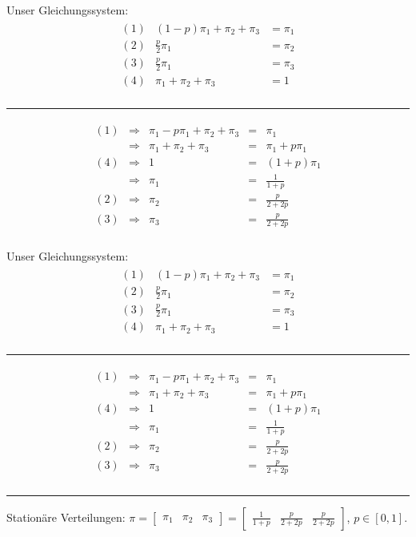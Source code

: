 \documentclass[t,11pt]{beamer}
\begin{document}
\begin{frame}
Unser Gleichungssystem:
\begin{align*}
\begin{matrix}
(1) & (1-p) \pi_1 + \pi_2 + \pi_3 &= \pi_1 \\
(2) & \frac{p}{2}\pi_1 &= \pi_2 \\
(3) & \frac{p}{2}\pi_1 &= \pi_3 \\
(4) & \pi_1+\pi_2+\pi_3 &= 1 \\
\end{matrix}
\end{align*}
\hrule
\begin{align*}
\begin{matrix}
(1) & \Longrightarrow & \pi_1-p\pi_1+\pi_2+\pi_3 &=& \pi_1 \\
& \Longrightarrow & \pi_1+\pi_2+\pi_3 &=& \pi_1 + p \pi_1 \\
(4) & \Longrightarrow & 1 &=& (1+p)\pi_1 \\
& \Longrightarrow & \pi_1 &=& \frac{1}{1+p} \\
(2) & \Longrightarrow & \pi_2 &=& \frac{p}{2+2p} \\
(3) & \Longrightarrow & \pi_3 &=& \frac{p}{2+2p} \\
\end{matrix}
\end{align*}
\end{frame}

\begin{frame}
Unser Gleichungssystem:
\begin{align*}
\begin{matrix}
(1) & (1-p) \pi_1 + \pi_2 + \pi_3 &= \pi_1 \\
(2) & \frac{p}{2}\pi_1 &= \pi_2 \\
(3) & \frac{p}{2}\pi_1 &= \pi_3 \\
(4) & \pi_1+\pi_2+\pi_3 &= 1 \\
\end{matrix}
\end{align*}
\hrule
\begin{align*}
\begin{matrix}
(1) & \Longrightarrow & \pi_1-p\pi_1+\pi_2+\pi_3 &=& \pi_1 \\
& \Longrightarrow & \pi_1+\pi_2+\pi_3 &=& \pi_1 + p \pi_1 \\
(4) & \Longrightarrow & 1 &=& (1+p)\pi_1 \\
& \Longrightarrow & \pi_1 &=& \frac{1}{1+p} \\
(2) & \Longrightarrow & \pi_2 &=& \frac{p}{2+2p} \\
(3) & \Longrightarrow & \pi_3 &=& \frac{p}{2+2p} \\
\end{matrix}
\end{align*}
\hrule
\vspace{0.2cm}

Stationäre Verteilungen: $\pi=\begin{bmatrix}
\pi_1 & \pi_2 & \pi_3 
\end{bmatrix} = \begin{bmatrix}
\frac{1}{1+p} & \frac{p}{2+2p} & \frac{p}{2+2p} 
\end{bmatrix}$, $p\in[0,1]$.
\end{frame}
\end{document}
